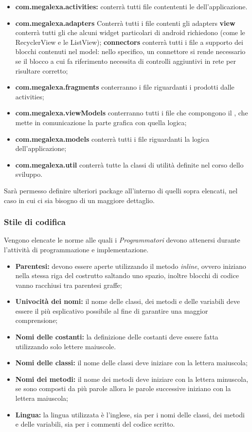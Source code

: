 \begin{itemize}
	\item  \textbf{com.megalexa.activities:} conterrà tutti file contententi le  dell'applicazione.
	\item  \textbf{com.megalexa.adapters} Conterrà tutti i file contenti gli adapters
			\subitem \textbf{view} conterrà tutti gli  che alcuni widget particolari di android richiedono (come le RecyclerView e le ListView);
			\subitem \textbf{connectors} conterrà tutti i file a supporto dei blocchi contenuti nel model: nello specifico, un connettore si rende necessario se il blocco a cui fa riferimento necessita di controlli aggiuntivi in rete per risultare corretto;
	\item  \textbf{com.megalexa.fragments} conterranno i file riguardanti i  prodotti dalle activities;
	\item  \textbf{com.megalexa.viewModels}	conterranno tutti i file che compongono il , che mette in comunicazione la parte grafica con quella logica;	
	\item  \textbf{com.megalexa.models} conterrà tutti i file riguardanti la 
	logica dell'applicazione;
	\item  \textbf{com.megalexa.util} conterrà tutte la classi di utilità definite nel corso dello sviluppo.	

\end{itemize}
Sarà permesso definire ulteriori package all'interno di quelli sopra elencati, nel caso in cui ci sia bisogno di un maggiore dettaglio.

\subsubsection{Stile di codifica} 
Vengono elencate le norme alle quali i \textit{Programmatori} devono attenersi durante l'attività di programmazione e implementazione.
\begin{itemize}
	\item \textbf{Parentesi:} devono essere aperte utilizzando il metodo \textit{inline}, ovvero iniziano nella stessa riga del costrutto saltando uno spazio, inoltre blocchi di codice vanno racchiusi tra parentesi graffe;
	\item \textbf{Univocità dei nomi:} il nome delle classi, dei metodi e delle variabili deve essere il più esplicativo possibile al fine di garantire una maggior comprensione;
	\item \textbf{Nomi delle costanti:} la definizione delle costanti deve essere fatta utilizzando solo lettere maiuscole.
	\item \textbf{Nomi delle classi:} il nome delle classi deve iniziare con la lettera maiuscola;
	\item \textbf{Nomi dei metodi:} il nome dei metodi deve iniziare con la lettera minuscola, se sono composti da più parole allora le parole successive iniziano con la lettera maiuscola;
	\item \textbf{Lingua:} la lingua utilizzata è l'inglese, sia per i nomi delle classi, dei metodi e delle variabili, sia per i commenti del codice scritto.
\end{itemize}

